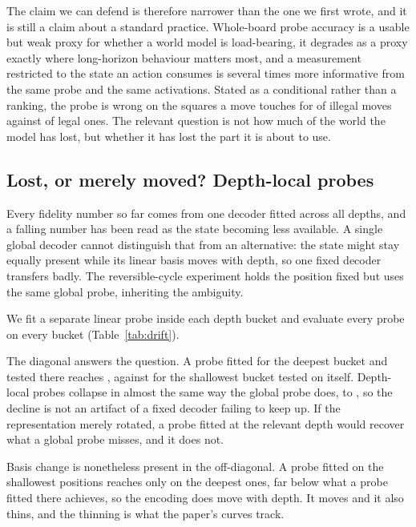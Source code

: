 \documentclass[manuscript, screen, review]{jair}
\theoremstyle{remark}
\begin{document}


The claim we can defend is therefore narrower than the one we first wrote, and it
is still a claim about a standard practice. Whole-board probe accuracy is a
usable but weak proxy for whether a world model is load-bearing, it degrades as a
proxy exactly where long-horizon behaviour matters most, and a measurement
restricted to the state an action consumes is several times more informative from
the same probe and the same activations. Stated as a conditional rather than a
ranking, the probe is wrong on the squares a move touches for
 of illegal moves against  of legal ones.
The relevant question is not how much of the world the model has lost, but
whether it has lost the part it is about to use.

\subsection{Lost, or merely moved? Depth-local probes}
\label{sec:drift}

Every fidelity number so far comes from one decoder fitted across all depths, and
a falling number has been read as the state becoming less available. A single global
decoder cannot distinguish that from an alternative: the state might stay equally
present while its linear basis moves with depth, so one fixed decoder transfers
badly. The reversible-cycle experiment holds the position fixed but uses the same
global probe, inheriting the ambiguity.

We fit a separate linear probe inside each depth bucket and evaluate every probe
on every bucket (Table~\ref{tab:drift}).



The diagonal answers the question. A probe fitted for the deepest bucket and
tested there reaches , against  for the
shallowest bucket tested on itself. Depth-local probes collapse in almost the
same way the global probe does,  to , so
the decline is not an artifact of a fixed decoder failing to keep up. If the
representation merely rotated, a probe fitted at the relevant depth would recover
what a global probe misses, and it does not.

Basis change is nonetheless present in the off-diagonal. A probe fitted on the
shallowest positions reaches only  on the deepest ones, far
below what a probe fitted there achieves, so the encoding does move with depth.
It moves and it also thins, and the thinning is what the paper's curves track.
\end{document}
